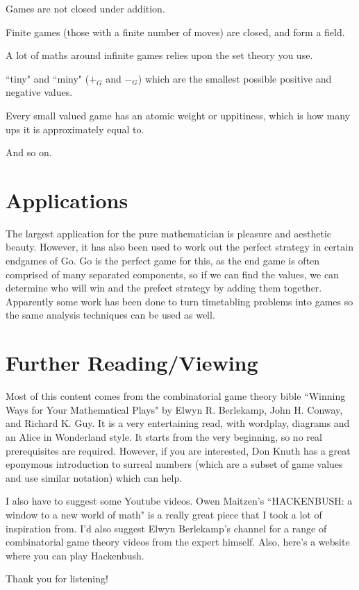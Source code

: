 \documentclass[]{article}
\begin{document}
Games are not closed under addition.

Finite games (those with a finite number of moves) are closed, and form a field.

A lot of maths around infinite games relies upon the set theory you use.

``tiny" and ``miny" ($+_G$ and $-_G$) which are the smallest possible positive and negative values.

Every small valued game has an atomic weight or uppitiness, which is how many ups it is approximately equal to.

And so on.

\section*{Applications}
The largest application for the pure mathematician is pleasure and aesthetic beauty. However, it has also been used to work out the perfect strategy in certain endgames of Go. Go is the perfect game for this, as the end game is often comprised of many separated components, so if we can find the values, we can determine who will win and the prefect strategy by adding them together. Apparently some work has been done to turn timetabling problems into games so the same analysis techniques can be used as well.

\section*{Further Reading/Viewing}
Most of this content comes from the combinatorial game theory bible ``Winning Ways for Your Mathematical Plays" by  Elwyn R. Berlekamp, John H. Conway, and Richard K. Guy. It is a very entertaining read, with wordplay, diagrams and an Alice in Wonderland style. It starts from the very beginning, so no real prerequisites are required. However, if you are interested, Don Knuth has a great eponymous introduction to surreal numbers (which are a subset of game values and use similar notation) which can help.

I also have to suggest some Youtube videos. Owen Maitzen's ``HACKENBUSH: a window to a new world of math" is a really great piece that I took a lot of inspiration from. I'd also suggest Elwyn Berlekamp's channel for a range of combinatorial game theory videos from the expert himself. Also, here's a website where you can play Hackenbush.

Thank you for listening!
\end{document}
